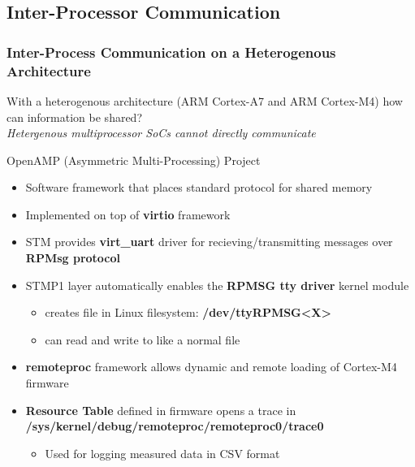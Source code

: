 \documentclass[8pt,compress,aspectratio=169]{beamer}
\newcommand\LightBold[1]{\textcolor{VSBlueLight}{\textbf{#1}}}
\newcommand\DarkBoldP[1]{\textcolor{VSPurpleDark}{\textbf{#1}}}
\begin{document}
\subsection{Inter-Processor Communication}
\begin{frame}
  \frametitle{Inter-Process Communication on a Heterogenous Architecture}
  With a heterogenous architecture (ARM Cortex-A7 and ARM Cortex-M4) how can information be shared?\\
  {\em \scriptsize Hetergenous multiprocessor SoCs cannot directly communicate }
  \break
  \begin{minipage}{0.465\textwidth}
    \begin{block}{OpenAMP (Asymmetric Multi-Processing) Project}
      \footnotesize
      \begin{itemize}
        \item Software framework that places standard protocol for shared memory
        \item Implemented on top of \DarkBoldP{virtio} framework
        \item STM provides \DarkBoldP{virt\_uart} driver for recieving/transmitting messages
          over \DarkBoldP{RPMsg protocol}
        \item STMP1 layer automatically enables the \DarkBoldP{RPMSG tty driver} kernel module
          \begin{itemize}
              \tiny
            \item creates file in Linux filesystem: \DarkBoldP{/dev/ttyRPMSG<X>}
            \item can read and write to like a normal file
          \end{itemize}
        \item \DarkBoldP{remoteproc} framework allows dynamic and remote loading of Cortex-M4 firmware
        \item \LightBold{Resource Table} defined in firmware opens a trace in\\
          {\scriptsize\DarkBoldP{/sys/kernel/debug/remoteproc/remoteproc0/trace0}}
          \begin{itemize}
              \tiny
            \item Used for logging measured data in CSV format
          \end{itemize}
      \end{itemize}

\end{block}
\end{minipage}
\end{frame}
\end{document}
